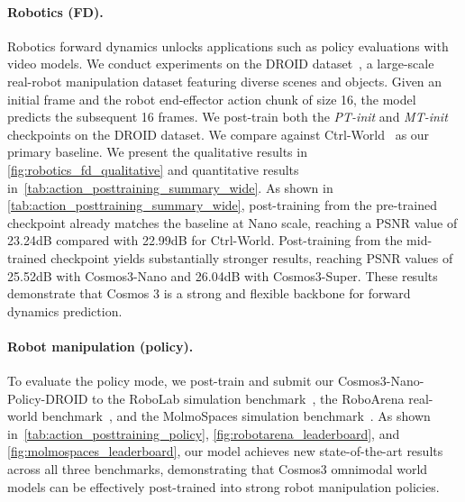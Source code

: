\paragraph{Robotics (FD).}
\label{sec:robot_fdm}
Robotics forward dynamics unlocks applications such as policy evaluations with video models.
We conduct experiments on the DROID dataset~\citep{khazatsky2024droid}, a large-scale real-robot manipulation dataset featuring diverse scenes and objects. 
Given an initial frame and the robot end-effector action chunk of size 16, the model predicts the subsequent 16 frames.
We post-train both the \textit{PT-init} and \textit{MT-init} checkpoints on the DROID dataset.
We compare against Ctrl-World~\citep{guo2026ctrlworld} as our primary baseline.
We present the qualitative results in \cref{fig:robotics_fd_qualitative} and quantitative results in~\cref{tab:action_posttraining_summary_wide}.
As shown in \cref{tab:action_posttraining_summary_wide}, post-training from the pre-trained checkpoint already matches the baseline at Nano scale, reaching a PSNR value of 23.24dB compared with 22.99dB for Ctrl-World. 
Post-training from the mid-trained checkpoint yields substantially stronger results, reaching PSNR values of 25.52dB with Cosmos3-Nano and 26.04dB with Cosmos3-Super. 
These results demonstrate that Cosmos 3 is a strong and flexible backbone for forward dynamics prediction.


\paragraph{Robot manipulation (policy).}
\label{sec:robot_manip_policy}
To evaluate the policy mode, we post-train and submit our Cosmos3-Nano-Policy-DROID to the RoboLab simulation benchmark~\citep{yang2026robolab}, the RoboArena real-world benchmark~\citep{atreya2025roboarena}, and the MolmoSpaces simulation benchmark~\citep{kim:arxiv2026}. 
As shown in~\cref{tab:action_posttraining_policy}, \cref{fig:robotarena_leaderboard}, and \cref{fig:molmospaces_leaderboard}, our model achieves new state-of-the-art results across all three benchmarks, demonstrating that Cosmos3 omnimodal world models can be effectively post-trained into strong robot manipulation policies.

